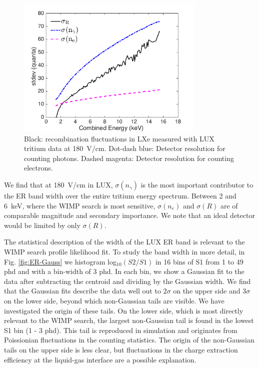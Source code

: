 \begin{figure}[h!]
\includegraphics[width=90mm]{fig/recomb_flucs.png}
\caption{Black: recombination fluctuations in LXe measured with LUX tritium data at 180~V/cm. Dot-dash blue: Detector resolution for counting photons. Dashed magenta: Detector resolution for counting electrons.}
\label{fig:recomb-flucs}
\end{figure}

We find that at 180~V/cm in LUX, $ \sigma(n_{\gamma})$ is the most important contributor to the ER band width over the entire tritium energy spectrum. Between 2 and 6~keV, where the WIMP search is most sensitive, $ \sigma(n_e)$ and $ \sigma(R)$ are of comparable magnitude and secondary importance. We note that an ideal detector would be limited by only $ \sigma(R)$.

The statistical description of the width of the LUX ER band is relevant to the WIMP search profile likelihood fit. To study the band width in more detail, in Fig. \ref{fig:ER-Gauss} we histogram log$_{10}(S2/S1)$ in 16 bins of S1 from 1 to 49 phd and with a bin-width of 3 phd. In each bin, we show a Gaussian fit to the data after subtracting the centroid and dividing by the Gaussian width. We find that the Gaussian fits describe the data well out to $2\sigma$ on the upper side and $3\sigma$ on the lower side, beyond which non-Gaussian tails are visible.  We have investigated the origin of these tails. On the lower side, which is most directly relevant to the WIMP search, the largest non-Gaussian tail is found in the lowest S1 bin (1 - 3 phd). This tail is reproduced in simulation and originates from Poissionian fluctuations in the counting statistics. The origin of the non-Gaussian tails on the upper side is less clear, but fluctuations in the charge extraction efficiency at the liquid-gas interface are a possible explanation.

